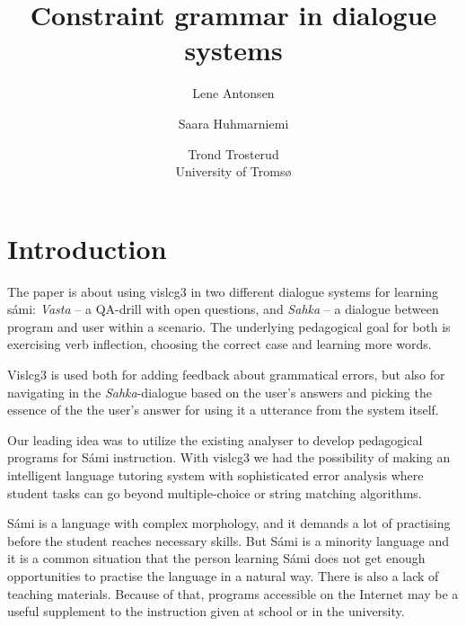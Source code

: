 \documentclass[11pt]{article}
\title{Constraint grammar in dialogue systems}
\author{Lene Antonsen  \and
              Saara Huhmarniemi \and Trond Trosterud \\ University of Tromsø}
\begin{document}

\maketitle
{}
 
\maketitle




\section{Introduction} 

The paper is about using vislcg3 in two different dialogue systems for learning sámi: \textit{Vasta} -- a QA-drill with open questions, and \textit{Sahka} -- a  dialogue between program and user within a scenario. The underlying pedagogical goal for both is exercising verb inflection, choosing the correct case and learning more words. 



Vislcg3 is used both for adding feedback about grammatical errors, but also for navigating in the \textit{Sahka}-dialogue based on the user's answers and picking the essence of the the user's answer for using it a utterance from the system itself. 

Our leading idea was to utilize the existing analyser to develop pedagogical programs for Sámi instruction. With vislcg3 we had the possibility of making an intelligent language tutoring system with sophisticated error analysis where student tasks can go beyond multiple-choice or string matching algorithms. 

Sámi is a language with complex morphology, and it demands a lot of practising before the student reaches necessary skills. But Sámi is a minority language and it is a common situation that the person learning Sámi does not get enough opportunities to practise the language in a natural way. There is also a lack of teaching materials. Because of that, programs accessible on the Internet may be a useful supplement to the instruction given at school or in the university. 
\end{document}
